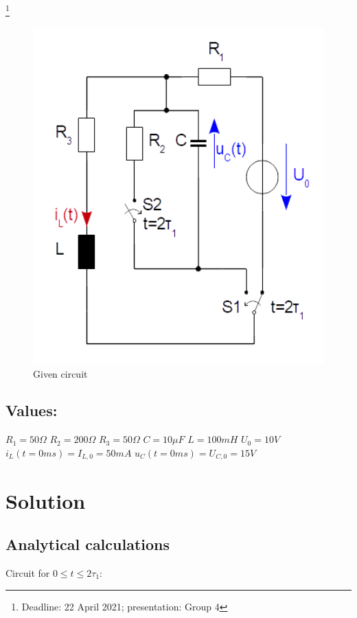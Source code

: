 \documentclass[a4paper]{article}
\newcommand\blfootnote[1]{%
	\begingroup
	\renewcommand\thefootnote{}\footnote{#1}%
	\addtocounter{footnote}{-1}%
	\endgroup
}
\begin{document}
	\vspace*{8cm}
	
\blfootnote{Deadline: 22 April 2021; \qquad presentation: Group 4}

\newpage	
\vspace*{4cm}
\begin{figure}[h!]
		\centering
			\includegraphics[width = 350pt]{./Figures/homework04_circuit.png}
			\caption{Given circuit}
			\label{fig:circuit_hw04}
\end{figure}

\vspace*{2cm} \subsection*{Values:}
$R_1 = 50\Omega$ \qquad $R_2 = 200\Omega$ \qquad $R_3 = 50\Omega$ \qquad $C = 10\mu F$ \qquad $L = 100mH$ \qquad $U_0 = 10V$ \newline 
$i_L(t=0ms)=I_{L,0}=50mA$ \qquad $u_C(t=0ms) = U_{C,0} = 15V$\\

\newpage
\section{Solution}
\subsection{Analytical calculations}
Circuit for $0 \leq t \leq 2\tau_1$:
\end{document}
